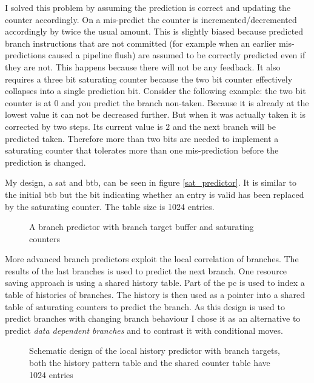 \documentclass[12pt,twoside,notitlepage]{report}
\begin{document}
I solved this problem by assuming the prediction is correct and updating the counter accordingly. On a mis-predict the counter is incremented/decremented accordingly by twice the usual amount. This is slightly biased because predicted branch instructions that are not committed (for example when an earlier mis-predictions caused a pipeline flush) are assumed to be correctly predicted even if they are not. This happens because there will not be any feedback. It also requires a three bit saturating counter because the two bit counter effectively collapses into a single prediction bit. Consider the following example: the two bit counter is at $0$ and you predict the branch non-taken. Because it is already at the lowest value it can not be decreased further. But when it was actually taken it is corrected by two steps. Its current value is $2$ and the next branch will be predicted taken. Therefore more than two bits are needed to implement a saturating counter that tolerates more than one mis-prediction before the prediction is changed.

My design, a \gls{sat} and \gls{btb}, can be seen in figure \ref{sat_predictor}. It is similar to the initial \gls{btb} but the bit indicating whether an entry is valid has been replaced by the saturating counter. The table size is 1024 entries.

\begin{figure}[htp]
\centering
\caption{A branch predictor with branch target buffer and saturating counters}
\end{figure}

More advanced branch predictors exploit the local correlation of branches. The results of the last branches is used to predict the next branch. One resource saving approach is using a shared history table. Part of the \gls{pc} is used to index a table of histories of branches. The history is then used as a pointer into a shared table of saturating counters to predict the branch. As this design is used to predict branches with changing branch behaviour I chose it as an alternative to predict \textit{data dependent branches} and to contrast it with conditional moves.

\begin{figure}[htp]
\centering
\caption{Schematic design of the local history predictor with branch targets, both the history pattern table and the shared counter table have 1024 entries}
\end{figure}
\end{document}
